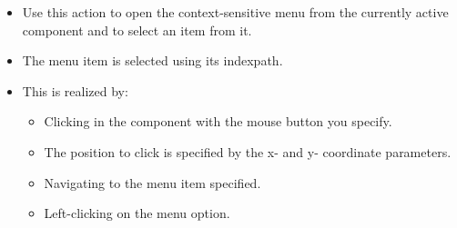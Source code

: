 
\begin{itemize}
\item Use this action to open the context-sensitive menu from the currently active component and to select an item from it.
\item The menu item is selected using its indexpath. 
\item This is realized by:
\begin{itemize}
\item Clicking in the component with the mouse button you specify. 
\item The position to click is specified by the x- and y- coordinate parameters.
\item Navigating to the menu item specified.
\item Left-clicking on the menu option.  
\end{itemize}
\end{itemize}


